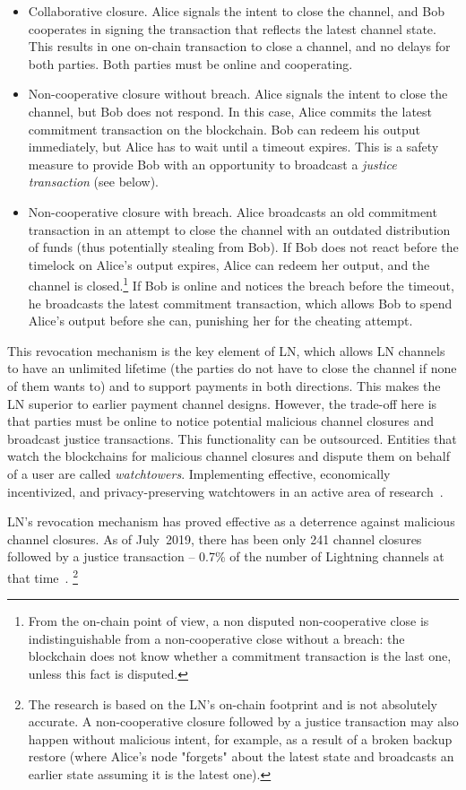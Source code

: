 \begin{itemize}
	\item Collaborative closure. Alice signals the intent to close the channel, and Bob cooperates in signing the transaction that reflects the latest channel state. This results in one on-chain transaction to close a channel, and no delays for both parties. Both parties must be online and cooperating.
	\item Non-cooperative closure without breach. Alice signals the intent to close the channel, but Bob does not respond. In this case, Alice commits the latest commitment transaction on the blockchain. Bob can redeem his output immediately, but Alice has to wait until a timeout expires. This is a safety measure to provide Bob with an opportunity to broadcast a \textit{justice transaction} (see below).
	\item Non-cooperative closure with breach. Alice broadcasts an old commitment transaction in an attempt to close the channel with an outdated distribution of funds (thus potentially stealing from Bob). If Bob does not react before the timelock on Alice's output expires, Alice can redeem her output, and the channel is closed.\footnote{From the on-chain point of view, a non disputed non-cooperative close is indistinguishable from a non-cooperative close without a breach: the blockchain does not know whether a commitment transaction is the last one, unless this fact is disputed.} If Bob is online and notices the breach before the timeout, he broadcasts the latest commitment transaction, which allows Bob to spend Alice's output before she can, punishing her for the cheating attempt.
\end{itemize}

This revocation mechanism is the key element of LN, which allows LN channels to have an unlimited lifetime (the parties do not have to close the channel if none of them wants to) and to support payments in both directions.
This makes the LN superior to earlier payment channel designs.
However, the trade-off here is that parties must be online to notice potential malicious channel closures and broadcast justice transactions.
This functionality can be outsourced.
Entities that watch the blockchains for malicious channel closures and dispute them on behalf of a user are called \textit{watchtowers}.
Implementing effective, economically incentivized, and privacy-preserving watchtowers in an active area of research~\cite{McCorry2019}.

LN's revocation mechanism has proved effective as a deterrence against malicious channel closures.
As of July~2019, there has been only 241 channel closures followed by a justice transaction -- 0.7\% of the number of Lightning channels at that time~\cite{BitMEXLN3}.
\footnote{The research is based on the LN's on-chain footprint and is not absolutely accurate. A non-cooperative closure followed by a justice transaction may also happen without malicious intent, for example, as a result of a broken backup restore (where Alice's node "forgets" about the latest state and broadcasts an earlier state assuming it is the latest one).}


